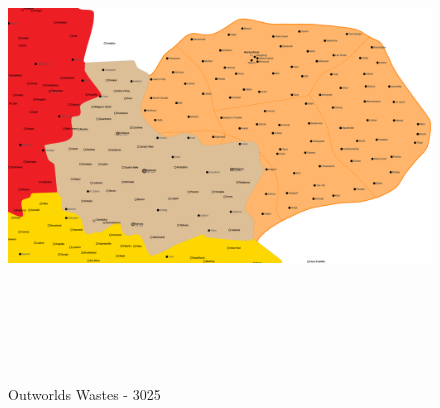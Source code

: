\begin{figure}[!h]
  \centering
  \includegraphics[alt='Outworlds Wastes Succession Wars Era map', width=8in, height=4.82in]{img/Outworlds-Wastes-3SW-Map.png}
  \caption*{Outworlds Wastes - 3025}
\end{figure}

